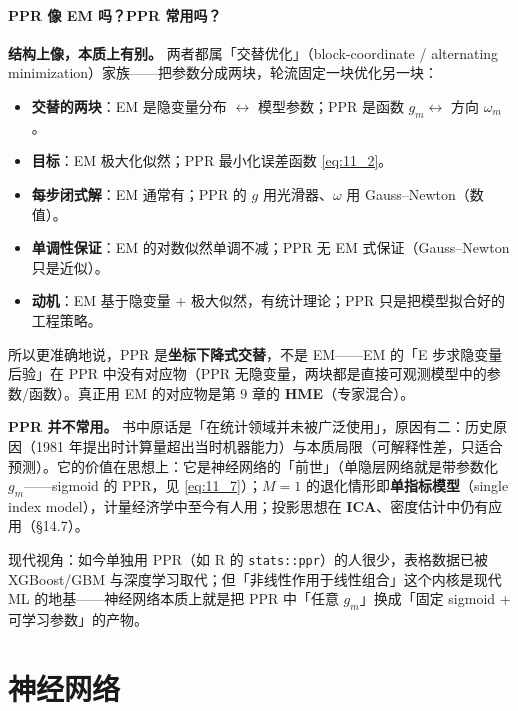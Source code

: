 \paragraph{PPR 像 EM 吗？PPR 常用吗？}

\textbf{结构上像，本质上有别。} 两者都属「交替优化」（block-coordinate / alternating minimization）家族——把参数分成两块，轮流固定一块优化另一块：

\begin{itemize}
\item \textbf{交替的两块}：EM 是隐变量分布 $\leftrightarrow$ 模型参数；PPR 是函数 $g_m \leftrightarrow$ 方向 $\omega_m$。
\item \textbf{目标}：EM 极大化似然；PPR 最小化误差函数 \ref{eq:11_2}。
\item \textbf{每步闭式解}：EM 通常有；PPR 的 $g$ 用光滑器、$\omega$ 用 Gauss--Newton（数值）。
\item \textbf{单调性保证}：EM 的对数似然单调不减；PPR 无 EM 式保证（Gauss--Newton 只是近似）。
\item \textbf{动机}：EM 基于隐变量 + 极大似然，有统计理论；PPR 只是把模型拟合好的工程策略。
\end{itemize}

所以更准确地说，PPR 是\textbf{坐标下降式交替}，不是 EM——EM 的「E 步求隐变量后验」在 PPR 中没有对应物（PPR 无隐变量，两块都是直接可观测模型中的参数/函数）。真正用 EM 的对应物是第 9 章的 \textbf{HME}（专家混合）。

\textbf{PPR 并不常用。} 书中原话是「在统计领域并未被广泛使用」，原因有二：历史原因（1981 年提出时计算量超出当时机器能力）与本质局限（可解释性差，只适合预测）。它的价值在思想上：它是神经网络的「前世」（单隐层网络就是带参数化 $g_m$——sigmoid 的 PPR，见 \ref{eq:11_7}）；$M=1$ 的退化情形即\textbf{单指标模型}（single index model），计量经济学中至今有人用；投影思想在 \textbf{ICA}、密度估计中仍有应用（§14.7）。

现代视角：如今单独用 PPR（如 R 的 \texttt{stats::ppr}）的人很少，表格数据已被 XGBoost/GBM 与深度学习取代；但「非线性作用于线性组合」这个内核是现代 ML 的地基——神经网络本质上就是把 PPR 中「任意 $g_m$」换成「固定 sigmoid + 可学习参数」的产物。

\section{神经网络}


